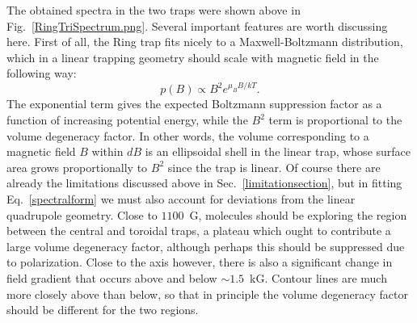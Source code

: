 The obtained spectra in the two traps were shown above in Fig.~\ref{RingTriSpectrum.png}.
Several important features are worth discussing here.
First of all, the Ring trap fits nicely to a Maxwell-Boltzmann distribution, which in a linear trapping geometry should scale with magnetic field in the following way:
\begin{equation}
\label{spectralform}
p(B)\propto B^2e^{\mu_B B/kT}.
\end{equation}
The exponential term gives the expected Boltzmann suppression factor as a function of increasing potential energy, while the $B^2$ term is proportional to the volume degeneracy factor.
In other words, the volume corresponding to a magnetic field $B$ within $dB$ is an ellipsoidal shell in the linear trap, whose surface area grows proportionally to $B^2$ since the trap is linear.
Of course there are already the limitations discussed above in Sec.~\ref{limitationsection}, but in fitting Eq.~\ref{spectralform} we must also account for deviations from the linear quadrupole geometry.
Close to $1100$~G, molecules should be exploring the region between the central and toroidal traps, a plateau which ought to contribute a large volume degeneracy factor, although perhaps this should be suppressed due to polarization.
Close to the axis however, there is also a significant change in field gradient that occurs above and below $\sim1.5$~kG. Contour lines are much more closely above  than below, so that in principle the volume degeneracy factor should be different for the two regions.

